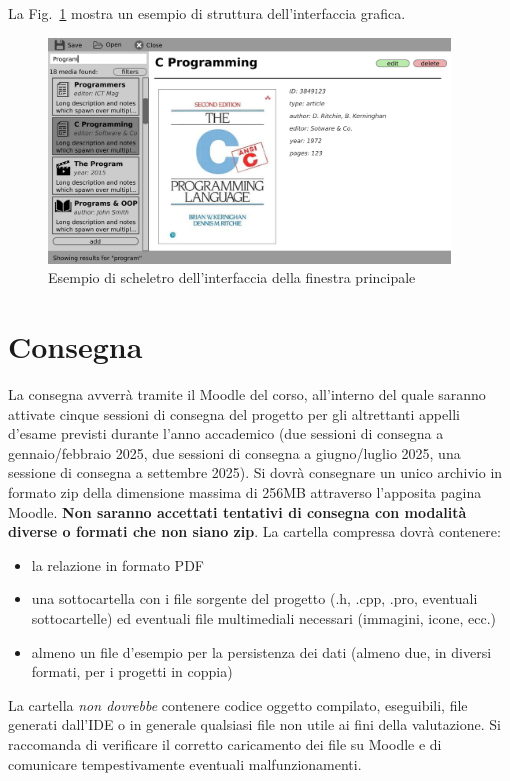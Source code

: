 \documentclass[10pt,a4paper,oneside]{article}
\begin{document}
La Fig.~\ref{fig:skeleton} mostra un esempio di struttura dell'interfaccia grafica.

\begin{figure}[t]
	\includegraphics[width=0.95\textwidth]{assets/gui-skeleton-sample}
	\caption{Esempio di scheletro dell'interfaccia della finestra principale}\label{fig:skeleton}
\end{figure}

\section{Consegna}
La consegna avverrà tramite il Moodle del corso, all'interno del quale saranno attivate cinque sessioni di consegna del progetto per gli altrettanti appelli d'esame previsti durante l'anno accademico (due sessioni di consegna a gennaio/febbraio 2025, due sessioni di consegna a giugno/luglio 2025, 
una sessione di consegna a settembre 2025). Si dovrà consegnare un unico archivio in formato zip della dimensione massima di 256MB attraverso l'apposita pagina Moodle. \textbf{Non saranno accettati tentativi di consegna con modalità diverse o formati che non siano zip}. La cartella compressa dovrà contenere:
\begin{itemize}
 \item la relazione in formato PDF
 \item una sottocartella con i file sorgente del progetto (.h, .cpp, .pro, eventuali sottocartelle) ed eventuali file multimediali necessari (immagini, icone, ecc.)
 \item almeno un file d'esempio per la persistenza dei dati (almeno due, in diversi formati, per i progetti in coppia)
\end{itemize}
La cartella \emph{non dovrebbe} contenere codice oggetto compilato, eseguibili, file generati dall'IDE o in generale qualsiasi file non utile ai fini della valutazione. Si raccomanda di verificare il corretto caricamento dei file su Moodle e di comunicare tempestivamente eventuali malfunzionamenti.
\end{document}
